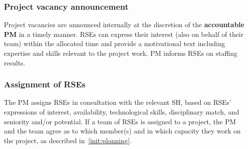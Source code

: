 
\subsubsection{Project vacancy announcement}

Project vacancies are announced internally at the discretion of the \textbf{accountable PM} in a timely manner.
RSEs can express their interest (also on behalf of their team) within the allocated time and provide a motivational text including
expertise and skills relevant to the project work. PM informs RSEs on staffing results.

\subsubsection{Assignment of RSEs}
%

The PM assigns RSEs in consultation with the
relevant SH, based on RSEs' expressions of interest, availability, technological skills, 
disciplinary match, and seniority and/or potential. 
%
If a team of RSEs is assigned to a project, the PM and the team agree as to which member(s) and in
which capacity they work on the project, as described in~\ref{init:planning}. %

